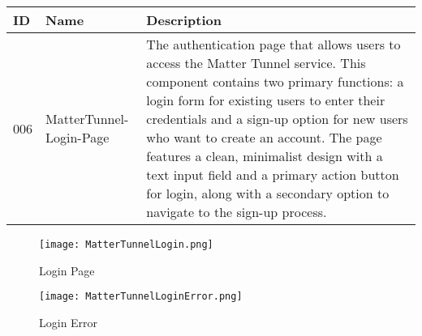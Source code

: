 \documentclass[conference]{IEEEtran}
\begin{document}
\begin{enumerate}[itemsep=2ex, parsep=1ex]
\begin{enumerate}[itemsep=2ex, parsep=1ex]
	      	      \begin{table}[h!]
	      	      	\def\arraystretch{1.24} \small
	      	      	\begin{tabular}{|p{1.2cm}|p{2.5cm}|p{4.0cm}|}
	      	      		\hline
	      	      		ID  & Name                    & Description                                                                                                                                                                                                                                                                                                                                                                                                                              \\
	      	      		\hline
	      	      		006 & MatterTunnel-Login-Page & The authentication page that allows users to access the Matter Tunnel service. This component contains two primary functions: a login form for existing users to enter their credentials and a sign-up option for new users who want to create an account. The page features a clean, minimalist design with a text input field and a primary action button for login, along with a secondary option to navigate to the sign-up process. \\
	      	      		\hline
	      	      	\end{tabular}
	      	      \end{table}

                  \begin{figure}[h!]
	      		\centering
	      		\texttt{[image: MatterTunnelLogin.png]}
	      		\caption{Login Page}
	      		\label{fig:enter-label}
	      	\end{figure}
	      	      
	      	      \begin{figure}[h!]
	      	      	\centering
	      	      	\texttt{[image: MatterTunnelLoginError.png]}
	      	      	\caption{Login Error}
	      	      	\label{fig:MatterTunnelLoginError}
	      	      \end{figure}
	      	      	      	      

\end{enumerate}
\end{enumerate}
\end{document}
